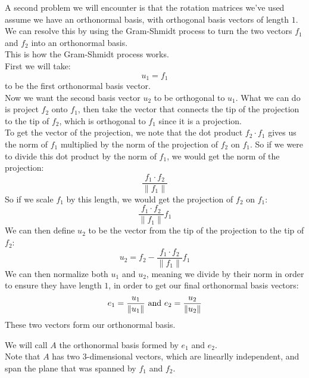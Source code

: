 \documentclass[12pt]{article}
\begin{document}
A second problem we will encounter is
that the rotation matrices we've used
assume we have an orthonormal basis,
with orthogonal basis vectors of length $1$. \\
We can resolve this by using
the Gram-Shmidt process to turn the
two vectors $f_1$ and $f_2$ into an orthonormal
basis. \\

This is how the Gram-Shmidt process works. \\
First we will take:
\[ u_1 = f_1 \]
to be the first orthonormal basis vector. \\
Now we want the second basis vector $u_2$ to
be orthogonal to $u_1$.
What we can do is project $f_2$ onto $f_1$,
then take the vector that connects
the tip of the projection to the tip of $f_2$,
which is orthogonal to $f_1$
since it is a projection. \\
To get the vector of the projection,
we note that the dot product $f_2 \cdot f_1$
gives us the norm of $f_1$
multiplied by the norm of the projection
of $f_2$ on $f_1$.
So if we were to divide this dot product
by the norm of $f_1$, we would
get the norm of the projection:
\[ \dfrac{f_1 \cdot f_2}{\|f_1\|} \]
So if we scale $f_1$ by this length,
we would get the projection
of $f_2$ on $f_1$:
\[ \dfrac{f_1 \cdot f_2}{\|f_1\|}f_1 \]
We can then define $u_2$
to be the vector from the tip of the projection
to the tip of $f_2$:
\[ u_2 = f_2 - \dfrac{f_1 \cdot f_2}{\|f_1\|}f_1 \]
We can then normalize both $u_1$ and $u_2$,
meaning we divide by their
norm in order to ensure they have length $1$,
in order to get our final orthonormal basis vectors:
\[ e_1 = \dfrac{u_1}{\|u_1\|} \text{ and }
e_2 = \dfrac{u_2}{\|u_2\|} \]
These two vectors form our orthonormal basis. 

We will call $A$ the orthonormal basis formed by
$e_1$ and $e_2$. \\
Note that $A$ has two $3$-dimensional vectors,
which are linearlly independent,
and span the plane that was spanned
by $f_1$ and $f_2$. \\
\end{document}
